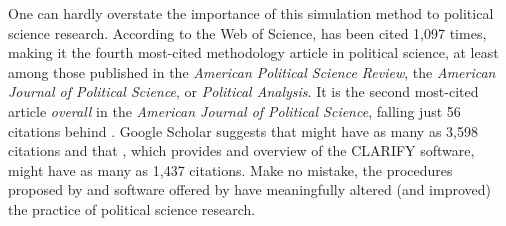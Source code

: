 \documentclass[10pt]{article}
\begin{document}
One can hardly overstate the importance of this simulation method to political science research. 
According to the Web of Science, \cite{KingTomzWittenberg2000} has been cited 1,097 times, making it the fourth most-cited methodology article in political science, at least among those published in the \textit{American Political Science Review}, the \textit{American Journal of Political Science}, or \textit{Political Analysis}. 
It is the second most-cited article \textit{overall} in the \textit{American Journal of Political Science}, falling just 56 citations behind \cite{BeckKatzTucker1998}.
Google Scholar suggests that \cite{KingTomzWittenberg2000} might have as many as 3,598 citations and that \cite{TomzWittenbergKing2003}, which provides and overview of the CLARIFY software, might have as many as 1,437 citations.
Make no mistake, the procedures proposed by \cite{KingTomzWittenberg2000} and software offered by \cite{TomzWittenbergKing2003} have meaningfully altered (and improved) the practice of political science research. 

\end{document}
